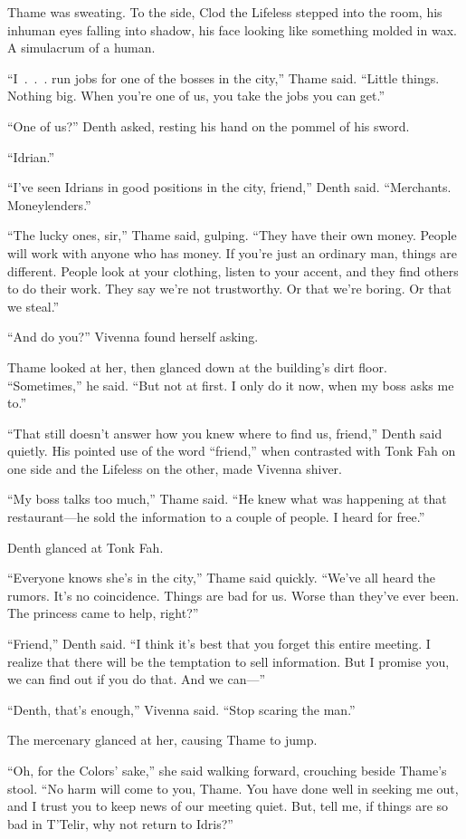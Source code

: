 Thame was sweating. To the side, Clod the Lifeless stepped into the room, his inhuman eyes falling into shadow, his face looking like something molded in wax. A simulacrum of a human.

“I~.~.~. run jobs for one of the bosses in the city,” Thame said. “Little things. Nothing big. When you’re one of us, you take the jobs you can get.”

“One of us?” Denth asked, resting his hand on the pommel of his sword.

“Idrian.”

“I’ve seen Idrians in good positions in the city, friend,” Denth said. “Merchants. Moneylenders.”

“The lucky ones, sir,” Thame said, gulping. “They have their own money. People will work with anyone who has money. If you’re just an ordinary man, things are different. People look at your clothing, listen to your accent, and they find others to do their work. They say we’re not trustworthy. Or that we’re boring. Or that we steal.”

“And do you?” Vivenna found herself asking.

Thame looked at her, then glanced down at the building’s dirt floor. “Sometimes,” he said. “But not at first. I only do it now, when my boss asks me to.”

“That still doesn’t answer how you knew where to find us, friend,” Denth said quietly. His pointed use of the word “friend,” when contrasted with Tonk Fah on one side and the Lifeless on the other, made Vivenna shiver.

“My boss talks too much,” Thame said. “He knew what was happening at that restaurant—he sold the information to a couple of people. I heard for free.”

Denth glanced at Tonk Fah.

“Everyone knows she’s in the city,” Thame said quickly. “We’ve all heard the rumors. It’s no coincidence. Things are bad for us. Worse than they’ve ever been. The princess came to help, right?”

“Friend,” Denth said. “I think it’s best that you forget this entire meeting. I realize that there will be the temptation to sell information. But I promise you, we can find out if you do that. And we can—”

“Denth, that’s enough,” Vivenna said. “Stop scaring the man.”

The mercenary glanced at her, causing Thame to jump.

“Oh, for the Colors’ sake,” she said walking forward, crouching beside Thame’s stool. “No harm will come to you, Thame. You have done well in seeking me out, and I trust you to keep news of our meeting quiet. But, tell me, if things are so bad in T’Telir, why not return to Idris?”

